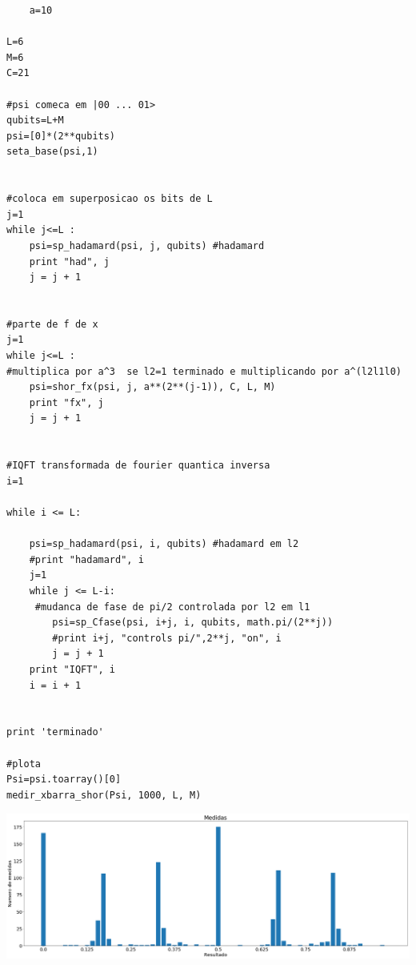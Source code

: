 \documentclass[12pt,a4paper]{article}
\begin{document}
\begin{verbatim}
    a=10

L=6
M=6
C=21

#psi comeca em |00 ... 01>
qubits=L+M
psi=[0]*(2**qubits)
seta_base(psi,1)


#coloca em superposicao os bits de L
j=1
while j<=L :
    psi=sp_hadamard(psi, j, qubits) #hadamard
    print "had", j
    j = j + 1
    

#parte de f de x
j=1
while j<=L :
#multiplica por a^3  se l2=1 terminado e multiplicando por a^(l2l1l0)
    psi=shor_fx(psi, j, a**(2**(j-1)), C, L, M) 
    print "fx", j
    j = j + 1
    

#IQFT transformada de fourier quantica inversa
i=1

while i <= L:
    
    psi=sp_hadamard(psi, i, qubits) #hadamard em l2 
    #print "hadamard", i
    j=1
    while j <= L-i:
     #mudanca de fase de pi/2 controlada por l2 em l1
        psi=sp_Cfase(psi, i+j, i, qubits, math.pi/(2**j))
        #print i+j, "controls pi/",2**j, "on", i
        j = j + 1
    print "IQFT", i
    i = i + 1
    

print 'terminado'

#plota
Psi=psi.toarray()[0]
medir_xbarra_shor(Psi, 1000, L, M)

\end{verbatim}
\includegraphics[scale=0.3]{relatorio-shor2.png}
\end{document}
